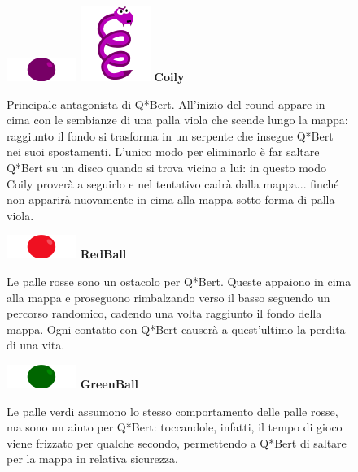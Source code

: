 \documentclass[a4paper,12pt, hidelinks]{report}
\begin{document}
\begin{figure}[H]
		\item
		\includegraphics[width=0.15\linewidth]{img/PurpleBall}
		\includegraphics[width=0.15\linewidth]{img/Coily}
		\label{img:Coily}
		\textbf{Coily}

		Principale antagonista di Q*Bert. All'inizio del round appare in cima con le sembianze di una palla viola che scende lungo la mappa: raggiunto il fondo si trasforma in un serpente che insegue Q*Bert nei suoi spostamenti. L'unico modo per eliminarlo è far saltare Q*Bert su un disco quando si trova vicino a lui: in questo modo Coily proverà a seguirlo e nel tentativo cadrà dalla mappa... finché non apparirà nuovamente in cima alla mappa sotto forma di palla viola.

\end{figure}

\begin{figure}[H]
		\item
		\includegraphics[width=0.15\linewidth]{img/RedBall}
		\label{img:RedBall}
		\textbf{RedBall}

		Le palle rosse sono un ostacolo per Q*Bert. Queste appaiono in cima alla mappa e proseguono rimbalzando verso il basso seguendo un percorso randomico, cadendo una volta raggiunto il fondo della mappa. Ogni contatto con Q*Bert causerà a quest'ultimo la perdita di una vita.

\end{figure}

\begin{figure}[H]
		\item
		\includegraphics[width=0.15\linewidth]{img/GreenBall}
		\label{img:GreenBall}
		\textbf{GreenBall}

		Le palle verdi assumono lo stesso comportamento delle palle rosse, ma sono un aiuto per Q*Bert: toccandole, infatti, il tempo di gioco viene frizzato per qualche secondo, permettendo a Q*Bert di saltare per la mappa in relativa sicurezza.

\end{figure}
\end{document}
